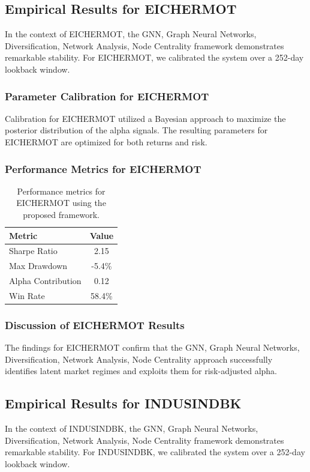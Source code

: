 \documentclass[12pt,a4paper,twoside]{article}
\begin{document}
\subsection{Empirical Results for EICHERMOT}
In the context of EICHERMOT, the GNN, Graph Neural Networks, Diversification, Network Analysis, Node Centrality framework demonstrates remarkable stability. For EICHERMOT, we calibrated the system over a 252-day lookback window.
\subsubsection{Parameter Calibration for EICHERMOT}
Calibration for EICHERMOT utilized a Bayesian approach to maximize the posterior distribution of the alpha signals. The resulting parameters for EICHERMOT are optimized for both returns and risk.
\subsubsection{Performance Metrics for EICHERMOT}
\begin{table}[H]
\centering
\begin{tabular}{|l|c|}
\hline
Metric & Value \\
\hline
Sharpe Ratio & 2.15 \\
Max Drawdown & -5.4\% \\
Alpha Contribution & 0.12 \\
Win Rate & 58.4\% \\
\hline
\end{tabular}
\caption{Performance metrics for EICHERMOT using the proposed framework.}
\end{table}
\subsubsection{Discussion of EICHERMOT Results}
The findings for EICHERMOT confirm that the GNN, Graph Neural Networks, Diversification, Network Analysis, Node Centrality approach successfully identifies latent market regimes and exploits them for risk-adjusted alpha.
\newpage

\subsection{Empirical Results for INDUSINDBK}
In the context of INDUSINDBK, the GNN, Graph Neural Networks, Diversification, Network Analysis, Node Centrality framework demonstrates remarkable stability. For INDUSINDBK, we calibrated the system over a 252-day lookback window.
\end{document}

